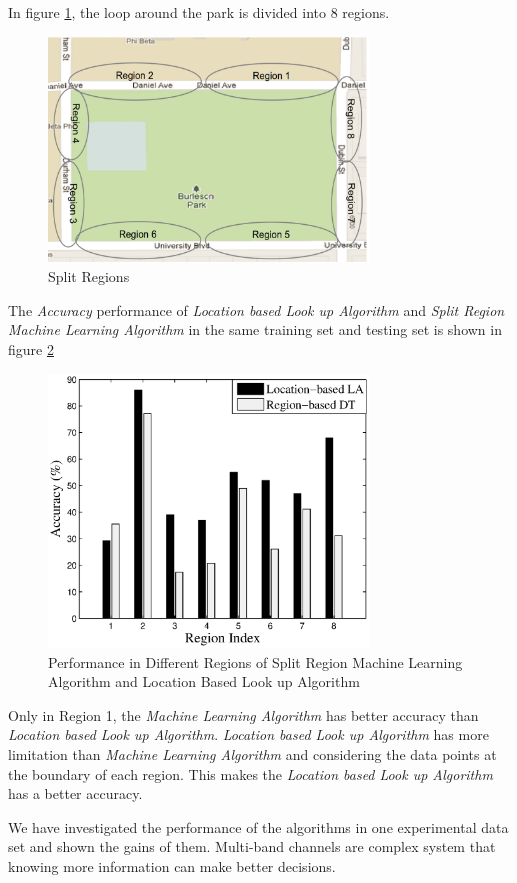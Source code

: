 In figure \ref{fig:region map}, the loop around the park is divided into 8 regions.

\begin{figure}
\centering
\includegraphics[width=85mm]{figure/region_map}
\caption{Split Regions}
\label{fig:region map}
\end{figure}

The \emph{Accuracy} performance of \emph{Location based Look up Algorithm} and \emph{Split Region Machine Learning Algorithm} in the same training set and testing set is shown in figure \ref{fig:mvsl}

 
\begin{figure}
\centering
\includegraphics[width=85mm]{figure/mvsl}
\caption{Performance in Different Regions of Split Region Machine Learning Algorithm and Location Based Look up Algorithm}
\label{fig:mvsl}
\end{figure}

Only in Region 1, the \emph{Machine Learning Algorithm} has better accuracy than \emph{Location based Look up Algorithm}. \emph{Location based Look up Algorithm} has more limitation than \emph{Machine Learning Algorithm} and considering the data points at the boundary of each region. This makes the \emph{Location based Look up Algorithm} has a better accuracy.

We have investigated the performance of the algorithms in one experimental data set and shown the gains of them. Multi-band channels are complex system that knowing more information can make better decisions.



